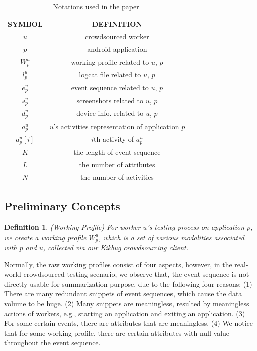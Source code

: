 \documentclass[10pt,conference]{IEEEtran}
\begin{document}
\begin{table}[!h]
\small
\centering
\caption{Notations used in the paper}
\begin{tabular}{c|c}
\hline
 SYMBOL&   DEFINITION\\\hline
    $u$ & crowdsourced worker \\\hline
    $p$ & android application\\\hline
$W^{u}_p$ & working profile related to $u$, $p$\\\hline
$l^{u}_p$ & logcat file related to $u$, $p$\\\hline
$e^{u}_p$ & event sequence related to $u$, $p$\\\hline
$s^{u}_p$ & screenshots related to $u$, $p$\\\hline
$d^{u}_p$ & device info. related to $u$, $p$\\\hline
    $a^{u}_p$ & $u$'s activities representation of application $p$\\\hline
    $a^{u}_p[i]$ & $i$th activity of $a^{u}_p$ \\\hline
    $K$ &  the length of event sequence\\\hline
    $L$ &  the number of attributes\\\hline
    $N$ &  the number of activities\\\hline
\end{tabular}
\label{tb:notations}
\end{table}


\subsection{Preliminary Concepts}

\newtheorem{definition}{Definition}
\begin{definition}
\emph{(Working Profile)}
For worker $u$'s testing process on application $p$,  we create a working profile $W^{u}_p$,
which is a set of  various modalities associated with $p$ and $u$,
collected via our Kikbug crowdsourcing client.
\end{definition}

Normally, the raw working profiles
consist of four aspects, however, in the real-world crowdsourced testing scenario, we observe that,
the event sequence is not directly usable for summarization purpose, due to the following four reasons: (1) There are many
redundant snippets of event sequences, which cause the data volume to be huge. (2) Many snippets are
meaningless, resulted by meaningless actions of workers, e.g., starting an application and exiting an application.
(3) For some certain events, there are attributes that are meaningless. (4) We notice that for some working profile,
there are certain attributes with null value throughout the event sequence.
\end{document}
